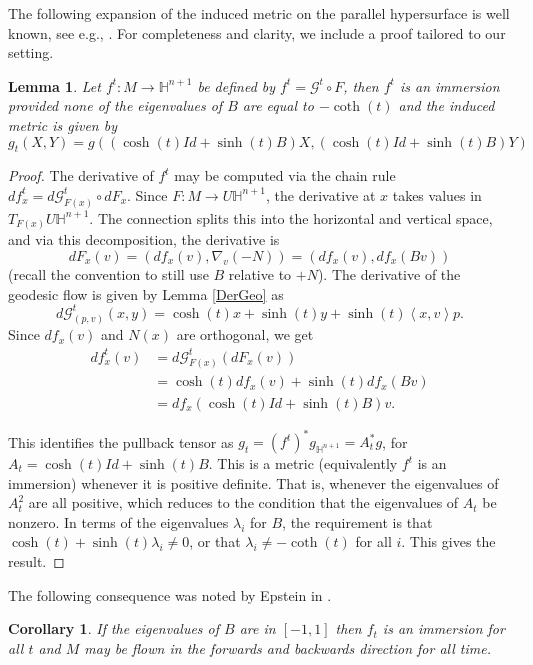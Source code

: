 \documentclass{amsart}
\newtheorem{lem}[thm]{Lemma}
\newtheorem{cor}[thm]{Corollary}
\numberwithin{equation}{section}
\renewcommand{\H}{\mathbb{H}}
\begin{document}
The following expansion of the induced metric on the parallel hypersurface is well known, see e.g., \cite{Krasnov-Schlenker2007}.
For completeness and clarity, we include a proof tailored to our setting. 

\begin{lem}
Let $f^t: M \to \H^{n+1}$ be defined by $f^t = \mathcal{G}^t \circ F$, then $f^t$ is an immersion provided none of the eigenvalues of $B$ are equal to $-\coth(t)$ and the induced metric is given by 
\[
g_t(X,Y) = g( (\cosh(t)Id + \sinh(t)B)X, (\cosh(t)Id + \sinh(t)B)Y)
\]
\end{lem}

\begin{proof}
The derivative of $f^t$ may be computed via the chain rule $df^t_x = d\mathcal{G}^t_{F(x)} \circ dF_x$.
Since $F: M \to U\H^{n+1}$, the derivative at $x$ takes values in $T_{F(x)}U\H^{n+1}$.
The connection splits this into the horizontal and vertical space, and via this decomposition, the derivative is 
\[
dF_x(v) = (df_x(v),\nabla_v(-N)) = (df_x(v),df_x(Bv))
\]
(recall the convention to still use $B$ relative to $+N$).
The derivative of the geodesic flow is given by Lemma \ref{DerGeo} as
\[
d\mathcal{G}^t_{(p,v)}(x,y) = \cosh(t)x + \sinh(t)y + \sinh(t)\left< x,v \right> p.
\]
Since $df_x(v)$ and $N(x)$ are orthogonal, we get
\begin{align*}
df^t_x(v) &= d\mathcal{G}^t_{F(x)}(dF_x(v)) \\
&= \cosh(t)df_x(v) + \sinh(t)df_x(Bv) \\
&= df_x(\cosh(t)Id + \sinh(t)B)v.
\end{align*}


This identifies the pullback tensor as $g_t = (f^t)^*g_{\H^{n+1}} = A_t^*g$, for $A_t = \cosh(t)Id + \sinh(t)B$.
This is a metric (equivalently $f^t$ is an immersion) whenever it is positive definite.
That is, whenever the eigenvalues of $A_t^2$ are all positive, which reduces to the condition that the eigenvalues of $A_t$ be nonzero. 
In terms of the eigenvalues $\lambda_i$ for $B$, the requirement is that $\cosh(t) + \sinh(t)\lambda_i \neq 0$, or that $\lambda_i \neq -\coth(t)$ for all $i$. 
This gives the result.
\end{proof}

The following consequence was noted by Epstein in \cite{Epstein1984}.

\begin{cor}
If the eigenvalues of $B$ are in $[-1,1]$ then $f_t$ is an immersion for all $t$ and $M$ may be flown in the forwards and backwards direction for all time. 
\end{cor}
\end{document}
